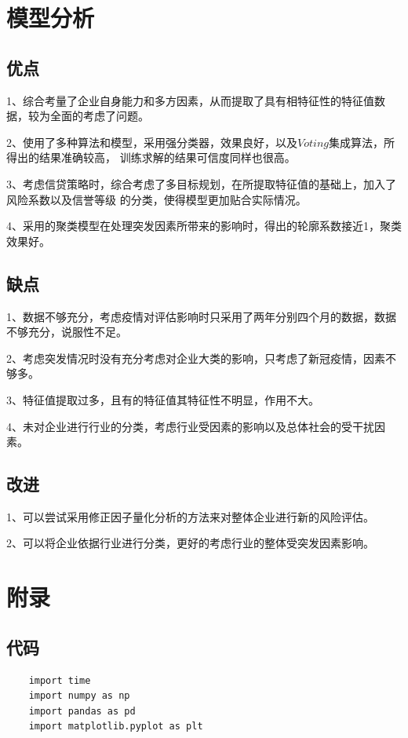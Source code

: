 \documentclass[UTF8]{ctexart}
\begin{document}
\section{模型分析}
\subsection{优点}

1、综合考量了企业自身能力和多方因素，从而提取了具有相特征性的特征值数据，较为全面的考虑了问题。

2、使用了多种算法和模型，采用强分类器，效果良好，以及$Voting$集成算法，所得出的结果准确较高，
训练求解的结果可信度同样也很高。

3、考虑信贷策略时，综合考虑了多目标规划，在所提取特征值的基础上，加入了风险系数以及信誉等级
的分类，使得模型更加贴合实际情况。

4、采用的聚类模型在处理突发因素所带来的影响时，得出的轮廓系数接近1，聚类效果好。

\subsection{缺点}
1、数据不够充分，考虑疫情对评估影响时只采用了两年分别四个月的数据，数据不够充分，说服性不足。

2、考虑突发情况时没有充分考虑对企业大类的影响，只考虑了新冠疫情，因素不够多。

3、特征值提取过多，且有的特征值其特征性不明显，作用不大。

4、未对企业进行行业的分类，考虑行业受因素的影响以及总体社会的受干扰因素。

\subsection{改进}
1、可以尝试采用修正因子量化分析的方法来对整体企业进行新的风险评估。

2、可以将企业依据行业进行分类，更好的考虑行业的整体受突发因素影响。


\clearpage

\clearpage

\section{附录}
\subsection{代码}

\lstset{language=python}
\begin{lstlisting}
	import time
	import numpy as np
	import pandas as pd
	import matplotlib.pyplot as plt

		
\end{lstlisting}
\end{document}
